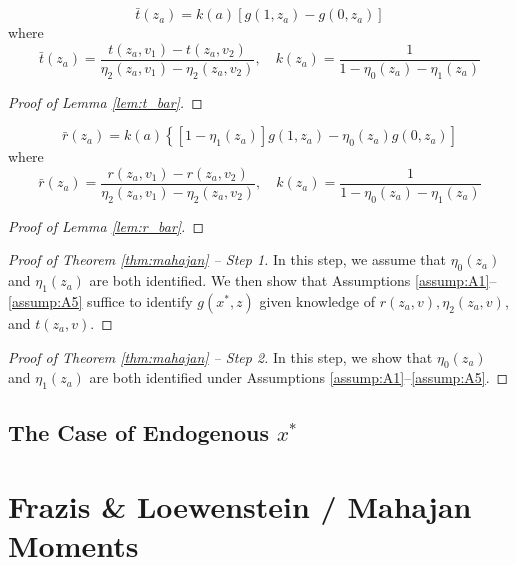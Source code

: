 \documentclass[12pt]{article}
\begin{document}
\begin{lem}[IV Estimator]
  \[\bar{t}(z_a) = k(a)\left[ g(1,z_a) - g(0,z_a) \right]\]
  where 
\[
\bar{t}(z_a) = \frac{t(z_a,v_1) - t(z_a,v_2)}{\eta_2(z_a,v_1) - \eta_2(z_a,v_2)}, \quad k(z_a) = \frac{1}{1 - \eta_0(z_a) - \eta_1(z_a)}
\]
  \label{lem:t_bar}
\end{lem}

\begin{proof}[Proof of Lemma \ref{lem:t_bar}]
\end{proof}

\begin{lem}
  \[\bar{r}(z_a) = k(a)\left\{\left[1 - \eta_1(z_a)\right] g(1,z_a) - \eta_0(z_a) g(0,z_a) \right]\]
    where 
\[
\bar{r}(z_a) = \frac{r(z_a,v_1) - r(z_a,v_2)}{\eta_2(z_a,v_1) - \eta_2(z_a,v_2)}, \quad k(z_a) = \frac{1}{1 - \eta_0(z_a) - \eta_1(z_a)}
\]
  \label{lem:r_bar}
\end{lem}

\begin{proof}[Proof of Lemma \ref{lem:r_bar}]
\end{proof}

\begin{proof}[Proof of Theorem \ref{thm:mahajan} -- Step 1]
  In this step, we assume that $\eta_0(z_a)$ and $\eta_1(z_a)$ are both identified.
  We then show that Assumptions \ref{assump:A1}--\ref{assump:A5} suffice to identify $g(x^*,z)$ given knowledge of $r(z_a,v), \eta_2(z_a,v)$, and $t(z_a,v)$.
\end{proof}

\begin{proof}[Proof of Theorem \ref{thm:mahajan} -- Step 2]
  In this step, we show that $\eta_0(z_a)$ and $\eta_1(z_a)$ are both identified under Assumptions \ref{assump:A1}--\ref{assump:A5}.
\end{proof}

\subsection{The Case of Endogenous $x^*$}


\section{Frazis \& Loewenstein / Mahajan Moments}
\end{document}
